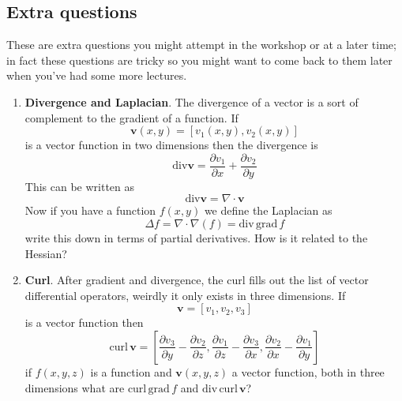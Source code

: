 \documentclass[11pt,a4paper]{scrartcl}
\begin{document}
\subsection*{Extra questions}

These are extra questions you might attempt in the workshop or at a
later time; in fact these questions are tricky so you might want to
come back to them later when you've had some more lectures.

\begin{enumerate}
\item \textbf{Divergence and Laplacian}. The divergence of a vector is
  a sort of complement to the gradient of a function. If
  \begin{equation}
    \mathbf{v}(x,y)=[v_1(x,y),v_2(x,y)]
  \end{equation}
  is a vector function in two dimensions then the divergence is
  \begin{equation}
    \textrm{div}\mathbf{v}=\frac{\partial v_1}{\partial x}+\frac{\partial v_2}{\partial y}
  \end{equation}
  This can be written as
  \begin{equation}
    \textrm{div}\mathbf{v}=\nabla\cdot\mathbf{v}
  \end{equation}
  Now if you have a function $f(x,y)$ we define the Laplacian as
  \begin{equation}
    \Delta f=\nabla\cdot\nabla(f)=\textrm{div}\,\textrm{grad}\,f
  \end{equation}
  write this down in terms of partial derivatives. How is it related to the Hessian?

 \item \textbf{Curl}. After gradient and divergence, the curl fills out the list of vector differential operators, weirdly it only exists in three dimensions. If 
\begin{equation}
    \mathbf{v}=[v_1,v_2,v_3]
  \end{equation}
is a vector function then
\begin{equation}
    \textrm{curl}\,\mathbf{v}=\left[\frac{\partial v_3}{\partial y}-\frac{\partial v_2}{\partial z},\frac{\partial v_1}{\partial z}-\frac{\partial v_3}{\partial x},\frac{\partial v_2}{\partial x}-\frac{\partial v_1}{\partial y}\right]
  \end{equation}
if $f(x,y,z)$ is a function and $\textbf{v}(x,y,z)$ a vector function, both in three dimensions what are $\textrm{curl}\,\textrm{grad}\,f$ and $\textrm{div}\,\textrm{curl}\,\textbf{v}$?


\end{enumerate}
\end{document}
